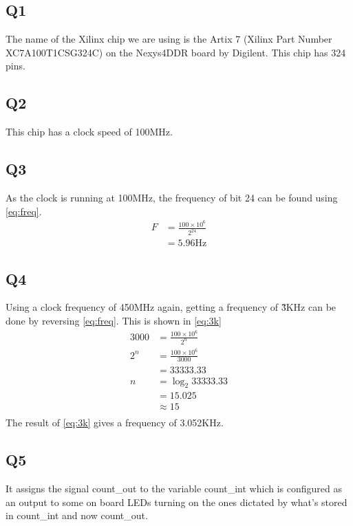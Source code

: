 \documentclass[a4paper, 12pt]{article}
\begin{document}
		\subsection{Q1}
			The name of the Xilinx chip we are using is the Artix 7 (Xilinx Part Number XC7A100T\-1CSG324C) on the Nexys4DDR board by Digilent. This chip has 324 pins.
		\subsection{Q2}
			This chip has a clock speed of 100MHz.
		\subsection{Q3}
			As the clock is running at 100MHz, the frequency of bit 24 can be found using \cref{eq:freq}.
			\begin{equation}
				\label{eq:freq}
				\begin{split}
					F & = \frac{100\times 10^6}{2^{24}}\\
					  & = 5.96 \text{Hz}
				\end{split}
			\end{equation}
		\subsection{Q4}
			Using a clock frequency of 450MHz again, getting a frequency of \~3KHz can be done by reversing \cref{eq:freq}. This is shown in \cref{eq:3k}
			\begin{equation}
				\label{eq:3k}
				\begin{split}
					3000 & = \frac{100\times 10^6}{2^{n}}\\
					2^n  & = \frac{100\times 10^6}{3000}\\
						 & = 33333.33\\
					n    & = \log_{2}{33333.33}\\
						 & = 15.025\\
						 & \approx 15\\
				\end{split}
			\end{equation}
			The result of \cref{eq:3k} gives a frequency of 3.052KHz.
		\subsection{Q5}
			It assigns the signal count\_out to the variable count\_int which is configured as an output to some on board LEDs turning on the ones dictated by what's stored in count\_int and now count\_out.
\end{document}
